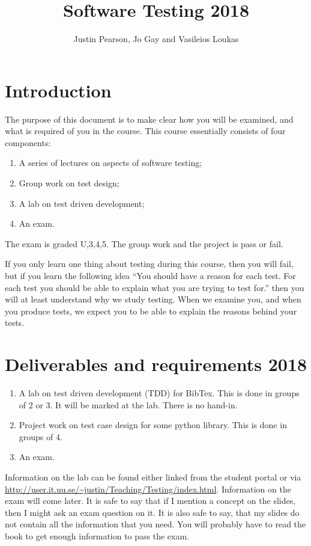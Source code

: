 \documentclass[a4page]{article}
\title{Software Testing 2018}
\author{Justin Pearson, Jo Gay and Vasileios Loukas}
\begin{document}
\maketitle
\def\UrlBreaks{\do\/\do-} 

\section{Introduction}
The purpose of this document is to make clear how you will be examined, and
what is required of you in the course.  This course essentially consists of
four components:
\begin{enumerate}
\item A series of lectures on aspects of software testing;
\item Group work on test design;
\item A lab on test driven development;
\item An exam.
\end{enumerate}
The exam is graded U,3,4,5. The group work and the project is pass or fail.

If you only learn one thing about testing during this course, then you will
fail, but if you learn the following idea ``You should have a reason for each
test. For each test you should be able to explain what you are trying to test
for.'' then you will at least understand why we study testing. When we examine
you, and when you produce tests, we expect you to be able to explain the
reasons behind your tests.


\section{Deliverables and requirements  2018}



\begin{enumerate}
\item A lab on  test driven development (TDD) for  BibTex.   This is
  done in groups of 2 or 3. It will be marked at the lab. There is no
  hand-in. 


\item Project work on test case design for some python library. This
  is done in groups of 4.
\item An exam.

  \end{enumerate}


  Information on the lab can be found either linked from the student portal or
  via
  \url{http://user.it.uu.se/~justin/Teaching/Testing/index.html}. Information
  on the exam will come later. It is safe to say that if I mention a concept
  on the slides, then I might ask an exam question on it. It is also safe to
  say, that my slides do not contain all the information that you need. You
  will probably have to read the book to get enough information to pass the
  exam.
\end{document}

